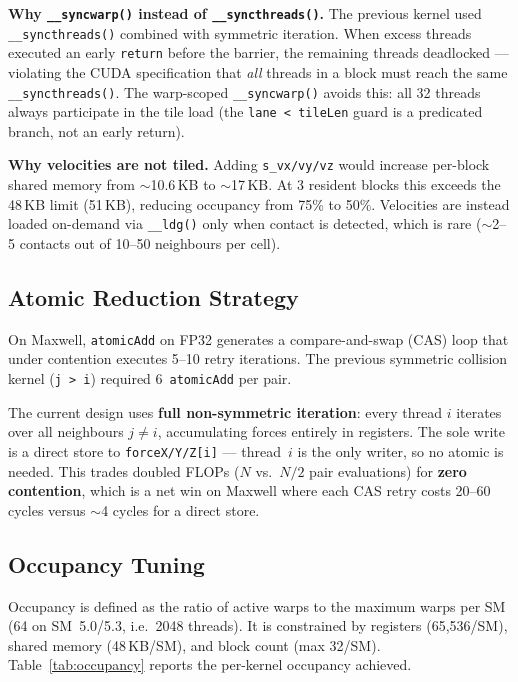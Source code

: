 \textbf{Why \texttt{\_\_syncwarp()} instead of \texttt{\_\_syncthreads()}.}
The previous kernel used \texttt{\_\_syncthreads()} combined with symmetric
iteration. When excess threads executed an early \texttt{return} before the
barrier, the remaining threads deadlocked --- violating the CUDA specification
that \emph{all} threads in a block must reach the same
\texttt{\_\_syncthreads()}. The warp-scoped \texttt{\_\_syncwarp()} avoids this:
all 32 threads always participate in the tile load (the
\texttt{lane < tileLen} guard is a predicated branch, not an early return).

\textbf{Why velocities are not tiled.} Adding \texttt{s\_vx/vy/vz} would
increase per-block shared memory from $\sim$10.6\,KB to $\sim$17\,KB. At 3
resident blocks this exceeds the 48\,KB limit (51\,KB), reducing occupancy
from 75\% to 50\%. Velocities are instead loaded on-demand via
\texttt{\_\_ldg()} only when contact is detected, which is rare ($\sim$2--5
contacts out of 10--50 neighbours per cell).

\subsection{Atomic Reduction Strategy}
\label{sec:atomics}

On Maxwell, \texttt{atomicAdd} on FP32 generates a compare-and-swap (CAS) loop
that under contention executes 5--10 retry iterations. The previous symmetric
collision kernel (\texttt{j > i}) required 6~\texttt{atomicAdd} per pair.

The current design uses \textbf{full non-symmetric iteration}: every thread $i$
iterates over all neighbours $j \neq i$, accumulating forces entirely in
registers. The sole write is a direct store to
\texttt{forceX/Y/Z[i]} --- thread~$i$ is the only writer, so no atomic is
needed. This trades doubled FLOPs ($N$ vs.\ $N/2$ pair evaluations) for
\textbf{zero contention}, which is a net win on Maxwell where each CAS retry
costs 20--60 cycles versus $\sim$4 cycles for a direct store.

\subsection{Occupancy Tuning}
\label{sec:occupancy}

Occupancy is defined as the ratio of active warps to the maximum warps per SM
(64 on SM~5.0/5.3, i.e.\ 2048 threads). It is constrained by registers
(65{,}536/SM), shared memory (48\,KB/SM), and block count (max 32/SM).
Table~\ref{tab:occupancy} reports the per-kernel occupancy achieved.

